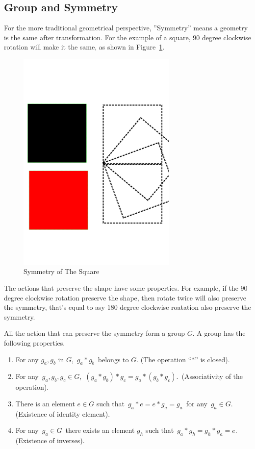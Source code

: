 \subsection{Group and Symmetry}
For the more traditional geometrical perspective, ''Symmetry''  means a geometry is the same after transformation.
For the example of a square,  $90$ degree clockwise rotation will make it the same, as shown in Figure~\ref{fig:symsquare}.
\begin{figure}[!htbp]
  	\begin{center}
   	\includegraphics[width=0.7\textwidth]{Symmetry}
	\end{center}
	\caption{Symmetry of The Square}
    \label{fig:symsquare}
\end{figure}

The actions that preserve the shape have some properties.
For example, if the $90$ degree clockwise rotation preserve the shape, then rotate twice will also preserve the symmetry, that's equal to asy $180$ degree clockwise roatation also preserve the symmetry.

All the action that can preserve the symmetry form a group $G$.
A group has the following properties.
\begin{enumerate}
\item For any $g_a,g_b$ in $G$, \,$g_a*g_b$\, belongs to $G$. (The operation
``$*$'' is closed).

\item For any \,$g_a,g_b,g_c\in G$, \,$(g_a*g_b)*g_c=g_a*(g_b*g_c)$. \,(Associativity of
the operation).

\item There is an element $e\in G$ such that \,$g_a*e=e*g_a=g_a$\, for any
\,$g_a\in G$. (Existence of identity element).

\item For any \,$g_a\in G$\, there exists an element $g_h$ such that
\,$g_a*g_h=g_h*g_a=e$. \,(Existence of inverses).
\end{enumerate}

